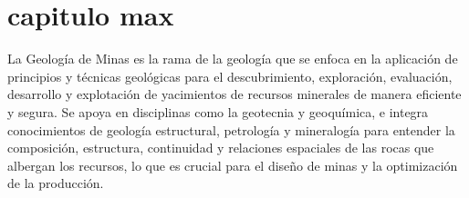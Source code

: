 \section{capitulo max}
La Geología de Minas es la rama de la geología que se enfoca en la aplicación de principios y técnicas geológicas para el descubrimiento, exploración, evaluación, desarrollo y explotación de yacimientos de recursos minerales de manera eficiente y segura. Se apoya en disciplinas como la geotecnia y geoquímica, e integra conocimientos de geología estructural, petrología y mineralogía para entender la composición, estructura, continuidad y relaciones espaciales de las rocas que albergan los recursos, lo que es crucial para el diseño de minas y la optimización de la producción. 